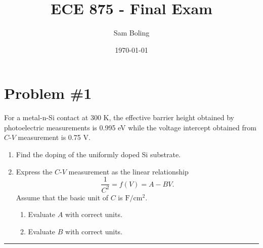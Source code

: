 \documentclass{article}
\title{ECE 875 - Final Exam}
\author{Sam Boling}
\date{\today}
\newcommand{\horline}
           {\begin{center}
              \noindent\rule{8cm}{0.4pt}
            \end{center}}
\begin{document}
\maketitle

\section*{Problem \#1}
For a metal-n-Si contact at 300 K, the effective barrier height obtained by
photoelectric measurements is 0.995 eV while the voltage intercept obtained 
from $C$-$V$ measurement is 0.75 V.

\begin{enumerate}
  \item{Find the doping of the uniformly doped Si substrate.
       }
  \item{Express the $C$-$V$ measurement as the linear relationship
        $$
        \frac{1}{C^2} = f(V) = A - BV.
        $$
        Assume that the basic unit of $C$ is $\mathrm{F}/\mathrm{cm}^{2}$.
        \begin{enumerate}
          \item{Evaluate $A$ with correct units.}
          \item{Evaluate $B$ with correct units.}
        \end{enumerate}
       }
\end{enumerate}
\horline
\end{document}

